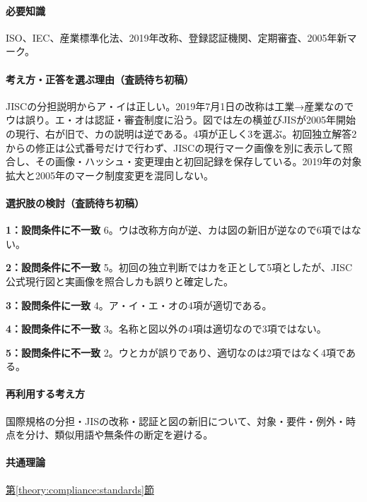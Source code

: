 \paragraph{必要知識} ISO、IEC、産業標準化法、2019年改称、登録認証機関、定期審査、2005年新マーク。

\paragraph{考え方・正答を選ぶ理由（査読待ち初稿）} JISCの分担説明からア・イは正しい。2019年7月1日の改称は工業→産業なのでウは誤り。エ・オは認証・審査制度に沿う。図では左の横並びJISが2005年開始の現行、右が旧で、カの説明は逆である。4項が正しく3を選ぶ。初回独立解答2からの修正は公式番号だけで行わず、JISCの現行マーク画像を別に表示して照合し、その画像・ハッシュ・変更理由と初回記録を保存している。2019年の対象拡大と2005年のマーク制度変更を混同しない。

\paragraph{選択肢の検討（査読待ち初稿）}\mbox{}\par

\noindent\textbf{1：設問条件に不一致} 6。ウは改称方向が逆、カは図の新旧が逆なので6項ではない。\par

\noindent\textbf{2：設問条件に不一致} 5。初回の独立判断ではカを正として5項としたが、JISC公式現行図と実画像を照合しカも誤りと確定した。\par

\noindent\textbf{3：設問条件に一致} 4。ア・イ・エ・オの4項が適切である。\par

\noindent\textbf{4：設問条件に不一致} 3。名称と図以外の4項は適切なので3項ではない。\par

\noindent\textbf{5：設問条件に不一致} 2。ウとカが誤りであり、適切なのは2項ではなく4項である。\par

\paragraph{再利用する考え方} 国際規格の分担・JISの改称・認証と図の新旧について、対象・要件・例外・時点を分け、類似用語や無条件の断定を避ける。

\paragraph{共通理論} \hyperref[theory:compliance:standards]{第\ref*{theory:compliance:standards}節}

